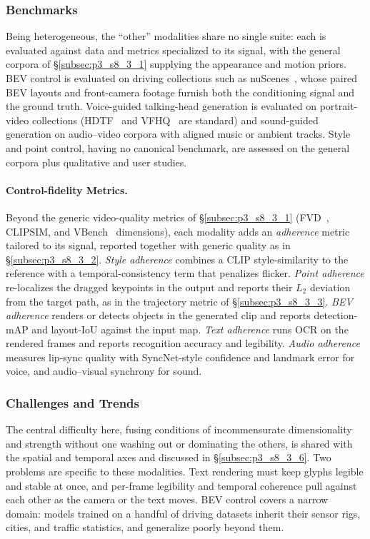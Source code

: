 \subsubsection{Benchmarks}
\label{subsubsec:p3_s8_3_4_benchmarks}
Being heterogeneous, the ``other'' modalities share no single suite: each is evaluated against data and metrics specialized to its signal, with the general corpora of §\ref{subsec:p3_s8_3_1} supplying the appearance and motion priors. BEV control is evaluated on driving collections such as nuScenes~\cite{caesar2020nuscenes}, whose paired BEV layouts and front-camera footage furnish both the conditioning signal and the ground truth. Voice-guided talking-head generation is evaluated on portrait-video collections (HDTF~\cite{zhang2021hdtf} and VFHQ~\cite{xie2022vfhq} are standard) and sound-guided generation on audio--video corpora with aligned music or ambient tracks. Style and point control, having no canonical benchmark, are assessed on the general corpora plus qualitative and user studies.

\paragraph{Control-fidelity Metrics.}
Beyond the generic video-quality metrics of §\ref{subsec:p3_s8_3_1} (FVD~\cite{unterthiner2018fvd}, CLIPSIM, and VBench~\cite{huang2023vbench} dimensions), each modality adds an \emph{adherence} metric tailored to its signal, reported together with generic quality as in §\ref{subsec:p3_s8_3_2}.
\emph{Style adherence} combines a CLIP style-similarity to the reference with a temporal-consistency term that penalizes flicker.
\emph{Point adherence} re-localizes the dragged keypoints in the output and reports their $L_2$ deviation from the target path, as in the trajectory metric of §\ref{subsec:p3_s8_3_3}.
\emph{BEV adherence} renders or detects objects in the generated clip and reports detection-mAP and layout-IoU against the input map.
\emph{Text adherence} runs OCR on the rendered frames and reports recognition accuracy and legibility.
\emph{Audio adherence} measures lip-sync quality with SyncNet-style confidence and landmark error for voice, and audio--visual synchrony for sound.

\subsubsection{Challenges and Trends}
\label{subsubsec:p3_s8_3_4_challenges}
The central difficulty here, fusing conditions of incommensurate dimensionality and strength without one washing out or dominating the others, is shared with the spatial and temporal axes and discussed in §\ref{subsec:p3_s8_3_6}. Two problems are specific to these modalities. Text rendering must keep glyphs legible and stable at once, and per-frame legibility and temporal coherence pull against each other as the camera or the text moves. BEV control covers a narrow domain: models trained on a handful of driving datasets inherit their sensor rigs, cities, and traffic statistics, and generalize poorly beyond them.
